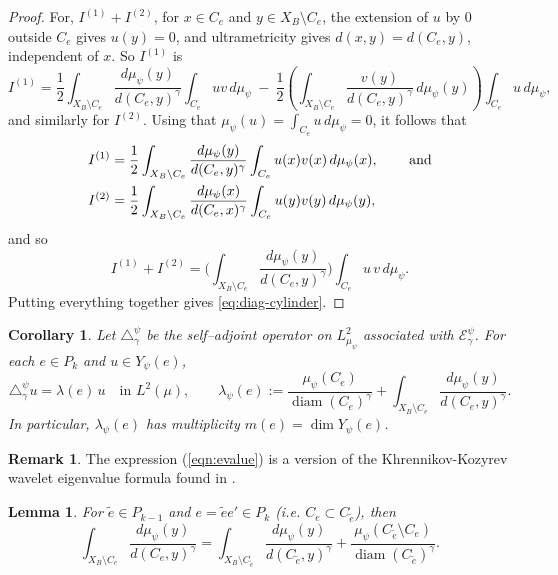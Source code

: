 \documentclass[12pt]{amsart}
\theoremstyle{plain}
\newtheorem{corollary}{Corollary}[section]
\newtheorem{lemma}{Lemma}[section]
\theoremstyle{definition}
\newtheorem{remark}{Remark}[section]
\begin{document}
\begin{proof}
For, $I^{(1)}+I^{(2)}$,
for $x\in C_e$ and $y\in X_B\setminus C_e$, the extension of $u$ by $0$ outside $C_e$ gives
$u(y)=0$, and ultrametricity gives $d(x,y)=d(C_e,y)$, independent of $x$. So $I^{(1)}$ is
$$I^{(1)}=\frac12 \int_{X_B\setminus C_e} \frac{d\mu_\psi(y)}{d(C_e,y)^\gamma}\int_{C_e}u v\,d\mu_\psi
   \ -\ \frac12\left(\int_{X_B\setminus C_e}\frac{v(y)}{d(C_e,y)^\gamma}\,d\mu_\psi(y)\right)\int_{C_e}u\,d\mu_\psi,$$
and similarly for $I^{(2)}$. Using that $\mu_\psi(u) = \int_{C_e}u\, d\mu_\psi = 0$, it follows that
\begin{align*}
I^{(1)}
&=\frac12\int_{X_B\setminus C_e}\frac{d\mu_\psi(y)}{d(C_e,y)^\gamma}\int_{C_e} u(x)v(x)\,d\mu_\psi(x) , \hspace{.3in}\mbox{and}\\ 
I^{(2)}
&=\frac12\int_{X_B\setminus C_e}\frac{d\mu_\psi(x)}{d(C_e,x)^\gamma}\int_{C_e} u(y)v(y)\,d\mu_\psi(y),
\end{align*}
and so
\[
I^{(1)}+I^{(2)}
=\Bigg(\int_{X_B\setminus C_e}\frac{d\mu_\psi(y)}{d(C_e,y)^\gamma}\Bigg)\int_{C_e} u\,v\,d\mu_\psi.
\]
Putting everything together gives \eqref{eq:diag-cylinder}.
\end{proof}

\begin{corollary}%
\label{cor:eig-cylinder}
Let $\triangle^\psi_\gamma$ be the self–adjoint operator on $L^2_{\mu_\psi}$ associated with $\mathcal{E}^\psi_\gamma $.
For each $e\in P_k$ and $u\in Y_\psi(e)$,
\begin{equation}
\label{eqn:evalue}
\triangle^\psi_\gamma u=\lambda(e)\,u\quad\text{in }L^2(\mu),
\qquad
\lambda_\psi(e):=\frac{\mu_\psi(C_e)}{\operatorname{diam}(C_e)^\gamma}
+\int_{X_B\setminus C_e}\frac{d\mu_\psi(y)}{d(C_e,y)^\gamma}.
\end{equation}
In particular, $\lambda_\psi(e)$ has multiplicity $m(e)=\dim Y_\psi(e)$.
\end{corollary}
\begin{remark}
    The expression (\ref{eqn:evalue}) is a version of the Khrennikov-Kozyrev wavelet eigenvalue formula found in \cite{KK:wavelets}.
\end{remark}
\begin{lemma}
\label{lem:ancestor}
For $\tilde e\in P_{k-1}$ and $e = \tilde{e}e' \in P_k$ (i.e. $C_e\subset C_{\tilde e}$), then
\[
\int_{X_B\setminus C_e}\frac{d\mu_\psi(y)}{d(C_e,y)^\gamma}
=\int_{X_B\setminus C_{\tilde e}}\frac{d\mu_\psi(y)}{d(C_{\tilde e},y)^\gamma}
+\frac{\mu_\psi(C_{\tilde e}\setminus C_e)}{\operatorname{diam}(C_{\tilde e})^\gamma}.
\]
\end{lemma}
\end{document}
